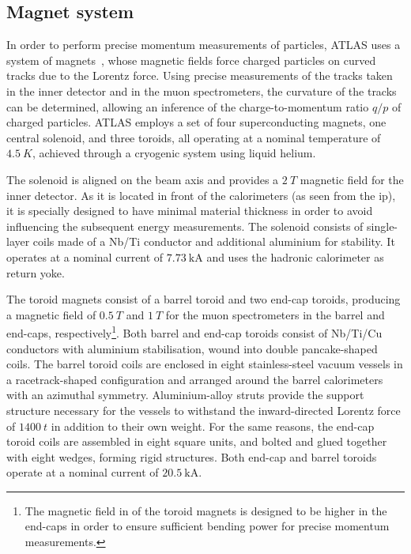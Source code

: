 \subsection{Magnet system}

In order to perform precise momentum measurements of particles, ATLAS uses a system of magnets~\cite{Aad:2008zzm}, whose magnetic fields force charged particles on curved tracks due to the Lorentz force.
Using precise measurements of the tracks taken in the inner detector and in the muon spectrometers, the curvature of the tracks can be determined, allowing an inference of the charge-to-momentum ratio $q/p$ of charged particles.
ATLAS employs a set of four superconducting magnets, one central solenoid, and three toroids, all operating at a nominal temperature of $\SI{4.5}{K}$, achieved through a cryogenic system using liquid helium. 

The solenoid is aligned on the beam axis and provides a $\SI{2}{T}$ magnetic field for the inner detector.
As it is located in front of the calorimeters (as seen from the \gls{ip}), it is specially designed to have minimal material thickness in order to avoid influencing the subsequent energy measurements.
The solenoid consists of single-layer coils made of a Nb/Ti conductor and additional aluminium for stability.
It operates at a nominal current of $\SI{7.73}{\kilo\ampere}$ and uses the hadronic calorimeter as return yoke.

The toroid magnets consist of a barrel toroid and two end-cap toroids, producing a magnetic field of $\SI{0.5}{T}$ and $\SI{1}{T}$ for the muon spectrometers in the barrel and end-caps, respectively\footnote{The magnetic field in of the toroid magnets is designed to be higher in the end-caps in order to ensure sufficient bending power for precise momentum measurements.}.
Both barrel and end-cap toroids consist of Nb/Ti/Cu conductors with aluminium stabilisation, wound into double pancake-shaped coils.
The barrel toroid coils are enclosed in eight stainless-steel vacuum vessels in a racetrack-shaped configuration and arranged around the barrel calorimeters with an azimuthal symmetry.
Aluminium-alloy struts provide the support structure necessary for the vessels to withstand the inward-directed Lorentz force of $\SI{1400}{t}$ in addition to their own weight.
For the same reasons, the end-cap toroid coils are assembled in eight square units, and bolted and glued together with eight wedges, forming rigid structures.
Both end-cap and barrel toroids operate at a nominal current of $\SI{20.5}{\kilo\ampere}$.

